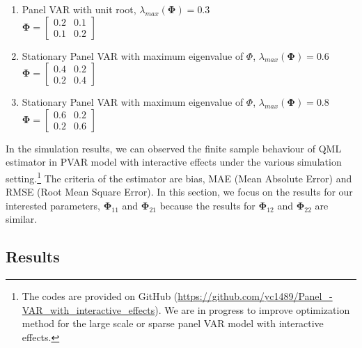 \documentclass[12pt,a4paper,hyperref]{article}
\begin{document}
\begin{enumerate}

\item   Panel VAR with unit root, $\lambda_{max}(\boldsymbol{\Phi})=0.3$
\\
$\boldsymbol{\Phi}=
\begin{bmatrix}
0.2 & 0.1 \\
0.1 & 0.2
\end{bmatrix}$


\item  Stationary Panel VAR with maximum eigenvalue of $\Phi$, $\lambda_{max}(\boldsymbol{\Phi})=0.6$ \\

$\boldsymbol{\Phi}=
\begin{bmatrix}
0.4 & 0.2 \\
0.2 & 0.4
\end{bmatrix}$



\item  Stationary Panel VAR with maximum eigenvalue of $\Phi$, $\lambda_{max}(\boldsymbol{\Phi})=0.8$ \\

$\boldsymbol{\Phi}=
\begin{bmatrix}
0.6 & 0.2 \\
0.2 & 0.6
\end{bmatrix}$
\\

\end{enumerate}

In the simulation results, we can observed the finite sample behaviour of QML estimator in PVAR model with interactive effects under the various simulation setting.\footnote{The codes are provided on GitHub (\url{https://github.com/yc1489/Panel_-VAR_with_interactive_effects}). We are in progress to improve optimization method for the large scale or sparse panel VAR model with interactive effects. } The criteria of the estimator are bias, MAE (Mean Absolute Error) and RMSE (Root Mean Square Error). In this section, we focus on the results for our interested parameters, $\boldsymbol{\Phi}_{11}$ and $\boldsymbol{\Phi}_{21}$ because the results for $\boldsymbol{\Phi}_{12}$ and $\boldsymbol{\Phi}_{22}$ are similar.



\subsection{Results}
\end{document}
